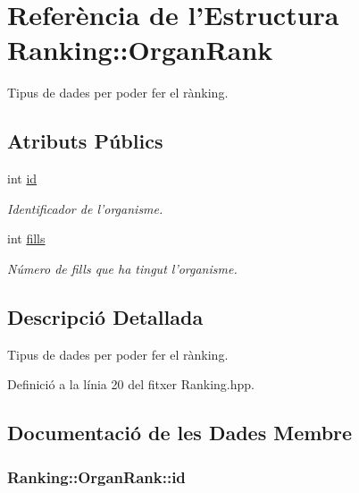 \hypertarget{struct_ranking_1_1_organ_rank}{\section{Referència de l'Estructura Ranking\-:\-:Organ\-Rank}
\label{struct_ranking_1_1_organ_rank}
}


Tipus de dades per poder fer el rànking.  


\subsection*{Atributs Públics}
\begin{DoxyCompactItemize}
\item 
int \hyperlink{struct_ranking_1_1_organ_rank_ac2d4f698161d7410be2d7a9e2e96bd5f}{id}
\begin{DoxyCompactList}\small\item\em Identificador de l'organisme. \end{DoxyCompactList}\item 
int \hyperlink{struct_ranking_1_1_organ_rank_a127f9a8768fd7cfda05c3cb2f9f8cfee}{fills}
\begin{DoxyCompactList}\small\item\em Número de fills que ha tingut l'organisme. \end{DoxyCompactList}\end{DoxyCompactItemize}


\subsection{Descripció Detallada}
Tipus de dades per poder fer el rànking. 

Definició a la línia 20 del fitxer Ranking.\-hpp.



\subsection{Documentació de les Dades Membre}
\hypertarget{struct_ranking_1_1_organ_rank_ac2d4f698161d7410be2d7a9e2e96bd5f}{
\subsubsection[{id}]{\setlength{\rightskip}{0pt plus 5cm}Ranking\-::\-Organ\-Rank\-::id}}\label{struct_ranking_1_1_organ_rank_ac2d4f698161d7410be2d7a9e2e96bd5f}


